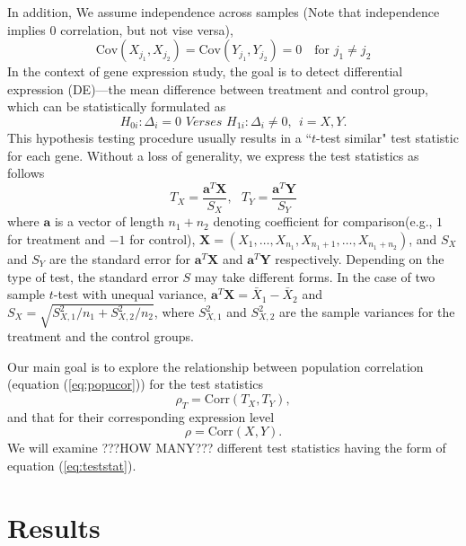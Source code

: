 \documentclass[12pt, a4paper]{article}
\newcommand{\cov}{\text{Cov}}
\newcommand{\cor}{\text{Corr}}
\begin{document}
	In addition, We assume independence across samples (Note that independence implies 0 correlation, but not vise versa), 
	\begin{equation}\label{eq:indepsamples}
	\cov(X_{j_1}, X_{j_2}) = \cov(Y_{j_1}, Y_{j_2}) = 0 \text{~~~for $j_1\neq j_2$}
	\end{equation}
	 In the context of gene expression study, the goal is to detect differential expression (DE)---the mean difference between treatment and control group, which can be statistically formulated as 
	 \begin{equation}\label{eq:hypotheses}
	 H_{0i}:  \Delta_i = 0 \textit{     Verses   }  H_{1i}: \Delta_i\neq 0 ,  ~~ i = X, Y.
	 \end{equation}
	This hypothesis testing procedure usually results in a ``$t$-test similar" test statistic for each gene. Without a loss of generality, we express the test statistics as follows
	\begin{equation}\label{eq:teststat}
	T_X = \dfrac{\bm a^T\bm X}{S_X},  ~~~ T_Y = \dfrac{\bm a^T \bm Y}{S_Y}
	\end{equation}  
	where $\bm a$ is a vector of length $n_1 + n_2$ denoting coefficient for comparison(e.g., $1$ for treatment and $-1$ for control), $\bm X = (X_1, \ldots, X_{n_1}, X_{n_1 +1}, \ldots, X_{n_1 + n_2})$, and  $S_X$ and $S_Y$ are the standard error for $\bm a^T\bm X$ and $\bm a^T\bm Y$ respectively. Depending on the type of test, the standard error $S$ may take different forms. In the case of two sample $t$-test with unequal variance, $\bm a^T\bm X = \bar{X}_1 - \bar{X}_2$ and $S_X = \sqrt{S_{X,1}^2/n_1 + S_{X,2}^2/n_2}$, where $ S_{X,1}^2$ and $S_{X,2}^2$ are the sample variances for the treatment and the control groups.
	
	Our main goal is to explore the relationship between population correlation (equation (\ref{eq:popucor})) for the test statistics 
	\begin{equation}
	\rho_T = \cor({T_X, T_Y}),
	\end{equation}  
	and that for their corresponding expression level 
	\begin{equation}
	\rho = \cor(X, Y). 
	\end{equation}
	We will examine ???HOW MANY??? different test statistics having the form of equation (\ref{eq:teststat}).%
	
	
	\section{Results}
	
\end{document}
